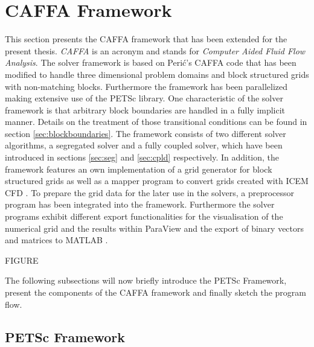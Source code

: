 \section{CAFFA Framework}

This section presents the CAFFA framework that has been extended for the present thesis. \emph{CAFFA} is an acronym and stands for \emph{Computer Aided Fluid Flow Analysis}. The solver framework is based on Peri\'c's CAFFA code \cite{caffawebpage,caffa3dwebpage} that has been modified to handle three dimensional problem domains and block structured grids with non-matching blocks. Furthermore the framework has been parallelized making extensive use of the PETSc library. One characteristic of the solver framework is that arbitrary block boundaries are handled in a fully implicit manner. Details on the treatment of those transitional conditions can be found in section \ref{sec:blockboundaries}. The framework consists of two different solver algorithms, a segregated solver and a fully coupled solver, which have been introduced in sections \ref{sec:seg} and \ref{sec:cpld} respectively. In addition, the framework features an own implementation of a grid generator for block structured grids as well as a mapper program to convert grids created with ICEM CFD \cite{icemdfd}. To prepare the grid data for the later use in the solvers, a preprocessor program has been integrated into the framework. Furthermore the solver programs exhibit different export functionalities for the visualisation of the numerical grid and the results within ParaView \cite{paraview} and the export of binary vectors and matrices to MATLAB \textregistered \cite{matlab}.

FIGURE

The following subsections will now briefly introduce the PETSc Framework, present the components of the CAFFA framework and finally sketch the program flow.

\subsection{PETSc Framework}

